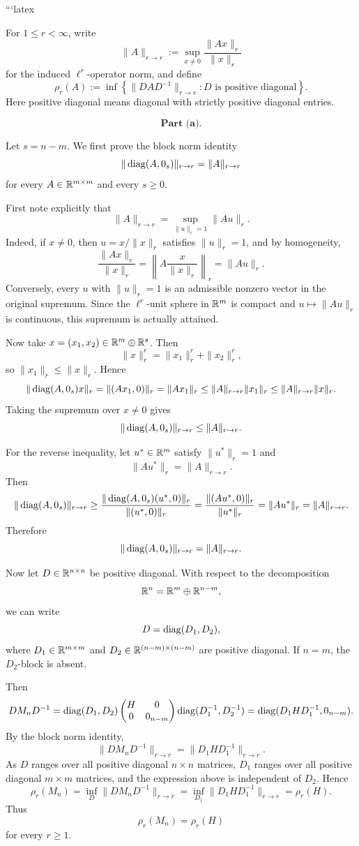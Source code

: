 ```latex
\[
\newcommand{\R}{\mathbb{R}}
\newcommand{\diag}{\operatorname{diag}}
\]

For \(1\le r<\infty\), write
\[
\|A\|_{r\to r}:=\sup_{x\ne 0}\frac{\|Ax\|_r}{\|x\|_r}
\]
for the induced \(\ell^r\)-operator norm, and define
\[
\rho_r(A):=\inf\left\{\|DAD^{-1}\|_{r\to r}: D \text{ is positive diagonal}\right\}.
\]
Here positive diagonal means diagonal with strictly positive diagonal entries.

\[
\textbf{Part (a).}
\]

Let \(s=n-m\). We first prove the block norm identity
\[
\|\diag(A,0_s)\|_{r\to r}=\|A\|_{r\to r}
\]
for every \(A\in\R^{m\times m}\) and every \(s\ge 0\).

First note explicitly that
\[
\|A\|_{r\to r}
=
\sup_{\|u\|_r=1}\|Au\|_r.
\]
Indeed, if \(x\ne 0\), then \(u=x/\|x\|_r\) satisfies \(\|u\|_r=1\), and by homogeneity,
\[
\frac{\|Ax\|_r}{\|x\|_r}
=
\left\|A\frac{x}{\|x\|_r}\right\|_r
=
\|Au\|_r.
\]
Conversely, every \(u\) with \(\|u\|_r=1\) is an admissible nonzero vector in the original supremum. Since the \(\ell^r\)-unit sphere in \(\R^m\) is compact and \(u\mapsto \|Au\|_r\) is continuous, this supremum is actually attained.

Now take \(x=(x_1,x_2)\in \R^m\oplus \R^s\). Then
\[
\|x\|_r^r=\|x_1\|_r^r+\|x_2\|_r^r,
\]
so \(\|x_1\|_r\le \|x\|_r\). Hence
\[
\|\diag(A,0_s)x\|_r
=
\|(Ax_1,0)\|_r
=
\|Ax_1\|_r
\le
\|A\|_{r\to r}\|x_1\|_r
\le
\|A\|_{r\to r}\|x\|_r.
\]
Taking the supremum over \(x\ne 0\) gives
\[
\|\diag(A,0_s)\|_{r\to r}\le \|A\|_{r\to r}.
\]

For the reverse inequality, let \(u^\ast\in\R^m\) satisfy \(\|u^\ast\|_r=1\) and
\[
\|Au^\ast\|_r=\|A\|_{r\to r}.
\]
Then
\[
\|\diag(A,0_s)\|_{r\to r}
\ge
\frac{\|\diag(A,0_s)(u^\ast,0)\|_r}{\|(u^\ast,0)\|_r}
=
\frac{\|(Au^\ast,0)\|_r}{\|u^\ast\|_r}
=
\|Au^\ast\|_r
=
\|A\|_{r\to r}.
\]
Therefore
\[
\|\diag(A,0_s)\|_{r\to r}=\|A\|_{r\to r}.
\]

Now let \(D\in\R^{n\times n}\) be positive diagonal. With respect to the decomposition
\[
\R^n=\R^m\oplus \R^{n-m},
\]
we can write
\[
D=\diag(D_1,D_2),
\]
where \(D_1\in\R^{m\times m}\) and \(D_2\in\R^{(n-m)\times(n-m)}\) are positive diagonal. If \(n=m\), the \(D_2\)-block is absent.

Then
\[
D M_n D^{-1}
=
\diag(D_1,D_2)
\begin{pmatrix}
H&0\\
0&0_{n-m}
\end{pmatrix}
\diag(D_1^{-1},D_2^{-1})
=
\diag(D_1HD_1^{-1},0_{n-m}).
\]
By the block norm identity,
\[
\|D M_nD^{-1}\|_{r\to r}
=
\|D_1HD_1^{-1}\|_{r\to r}.
\]
As \(D\) ranges over all positive diagonal \(n\times n\) matrices, \(D_1\) ranges over all positive diagonal \(m\times m\) matrices, and the expression above is independent of \(D_2\). Hence
\[
\rho_r(M_n)
=
\inf_D \|D M_nD^{-1}\|_{r\to r}
=
\inf_{D_1}\|D_1HD_1^{-1}\|_{r\to r}
=
\rho_r(H).
\]
Thus
\[
\boxed{\rho_r(M_n)=\rho_r(H)}
\]
for every \(r\ge 1\).

